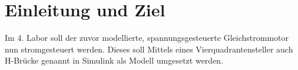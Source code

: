 \section{Einleitung und Ziel}

Im 4. Labor soll der zuvor modellierte, spannungsgesteuerte
Gleichstrommotor nun stromgesteuert werden. Dieses soll Mittels
eines Vierquadrantensteller auch H-Brücke genannt in Simulink
als Modell umgesetzt werden.
